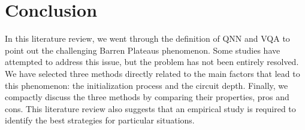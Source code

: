 \section{Conclusion}
In this literature review, we went through the definition of QNN and VQA to point out the challenging Barren Plateaus phenomenon. 
Some studies have attempted to address this issue, but the problem has not been entirely resolved.
We have selected three methods directly related to the main factors that lead to this phenomenon: the initialization process and the circuit depth.
Finally, we compactly discuss the three methods by comparing their properties, pros and cons.
This literature review also suggests that an empirical study is required to identify the best strategies for particular situations.